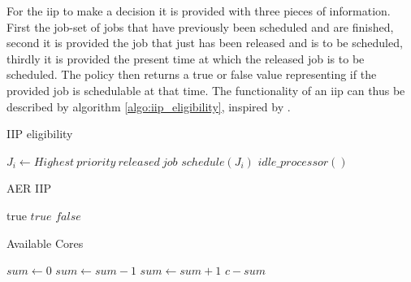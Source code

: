 \documentclass{kththesis}
\begin{document}
For the \acrshort{iip} to make a decision it is provided with three pieces of information. First
the job-set of jobs that have previously been scheduled and are finished, second it is provided the
job that just has been released and is to be scheduled, thirdly it is provided the present time at
which the released job is to be scheduled.  The policy then returns a true or false value
representing if the provided job is schedulable at that time. The functionality of an \acrshort{iip}
can thus be described by algorithm \ref{algo:iip_eligibility}, inspired by
\parencite{nasri_exact_2017}.

\begin{algorithm}
    \caption{IIP eligibility}
    \label{algo:iip_eligibility}
    \begin{algorithmic}[1]
        \State $J_i\gets Highest\ priority\ released\ job$
            \State $schedule(J_i)$
        \Else
            \State $idle\_processor()$
        \EndIf
    \end{algorithmic}
\end{algorithm}

\begin{algorithm}
    \caption{AER IIP}
    \label{algo:aer_iip}
    \begin{algorithmic}[1]
                \State \Return true
            \Else
                    \State \Return $true$
                \Else
                    \State \Return $false$
                \EndIf
            \EndIf
        \EndFunction
    \end{algorithmic}
\end{algorithm}

\begin{algorithm}
    \caption{Available Cores}
    \label{algo:available_cores}
    \begin{algorithmic}[1]
            \State $sum\gets 0$
                    \State $sum\gets sum-1$
                    \State $sum\gets sum+1$
                \EndIf
            \EndFor
            \State \Return $c - sum$
        \EndFunction
    \end{algorithmic}
\end{algorithm}
\end{document}
